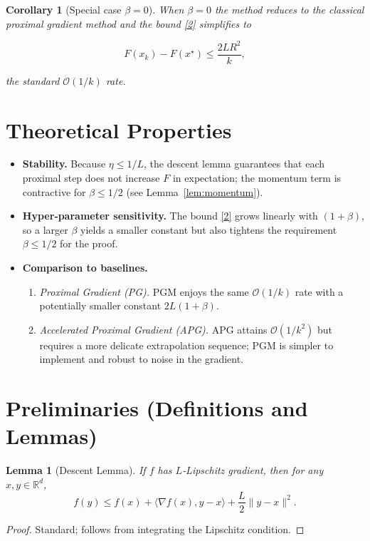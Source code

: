 \documentclass[11pt]{article}
\newtheorem{lemma}{Lemma}[section]
\newtheorem{corollary}{Corollary}[section]
\begin{document}
\begin{corollary}[Special case $\beta=0$]\label{cor:pgd}
When $\beta=0$ the method reduces to the classical proximal gradient method and the bound \eqref{2} simplifies to  

\[
F(x_{k})-F(x^{\star})\le\frac{2LR^{2}}{k},
\]

the standard $\mathcal{O}(1/k)$ rate.
\end{corollary}

\section*{Theoretical Properties}
\begin{itemize}
  \item \textbf{Stability.}  Because $\eta\le1/L$, the descent lemma guarantees that each proximal step does not increase $F$ in expectation; the momentum term is contractive for $\beta\le 1/2$ (see Lemma~\ref{lem:momentum}).
  \item \textbf{Hyper‑parameter sensitivity.}  The bound \eqref{2} grows linearly with $(1+\beta)$, so a larger $\beta$ yields a smaller constant but also tightens the requirement $\beta\le 1/2$ for the proof.
  \item \textbf{Comparison to baselines.}
    \begin{enumerate}[label=(\roman*)]
      \item \emph{Proximal Gradient (PG).}  PGM enjoys the same $\mathcal{O}(1/k)$ rate with a potentially smaller constant $2L(1+\beta)$.
      \item \emph{Accelerated Proximal Gradient (APG).}  APG attains $\mathcal{O}(1/k^{2})$ but requires a more delicate extrapolation sequence; PGM is simpler to implement and robust to noise in the gradient.
    \end{enumerate}
\end{itemize}

\section*{Preliminaries (Definitions and Lemmas)}
\begin{lemma}[Descent Lemma]\label{lem:descent}
If $f$ has $L$‑Lipschitz gradient, then for any $x,y\in\mathbb{R}^{d}$,
\[
f(y)\le f(x)+\langle\nabla f(x),y-x\rangle+\frac{L}{2}\|y-x\|^{2}.
\tag{3}
\]
\end{lemma}
\begin{proof}
Standard; follows from integrating the Lipschitz condition.
\end{proof}
\end{document}
